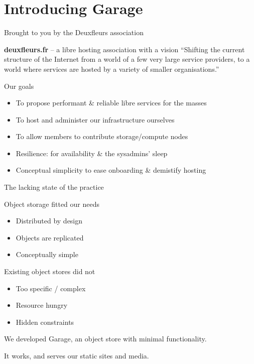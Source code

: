 \section{Introducing Garage}

\begin{frame}{Brought to you by the Deuxfleurs association}

\begin{block}{\textbf{deuxfleurs.fr} -- a libre hosting association with a vision}
``Shifting the current structure of the Internet from a world of a few very large service providers, to a world where services are hosted by a variety of smaller organisations.''	
\end{block}


\begin{block}{Our goals}
\begin{itemize}
	\item To propose performant \& reliable libre services for the masses
	\item To host and administer our infrastructure ourselves
	\item To allow members to contribute storage/compute nodes
	\item Resilience: for availability \& the sysadmins' sleep 
	\item Conceptual simplicity to ease onboarding \& demistify hosting
\end{itemize}
\end{block}


\end{frame}

\begin{frame}{The lacking state of the practice}

\begin{block}{Object storage fitted our needs}
\begin{itemize}
	\item Distributed by design
	\item Objects are replicated
	\item Conceptually simple
\end{itemize}
\end{block}
\vfill 

\begin{block}{Existing object stores did not}
	\begin{itemize}
		\item Too specific / complex 
		\item Resource hungry 
		\item Hidden constraints 
	\end{itemize}
\end{block}
\vfill

We developed Garage, an object store with minimal functionality.

It works, and serves our static sites and media.

\end{frame}

